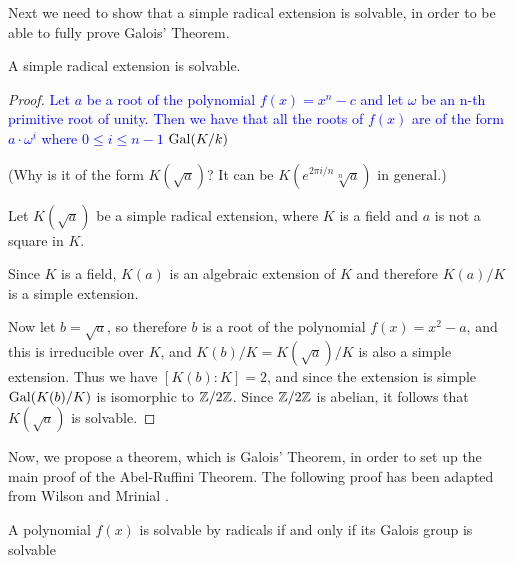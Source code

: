 Next we need to show that a simple radical extension is solvable, in order to be able to fully prove Galois' Theorem.

\begin{lemma}\label{lemma:solvable-radical-extension}
    A simple radical extension is solvable.
\end{lemma}

\begin{proof}

    \textcolor{blue}{Let $a$ be a root of the polynomial $f(x)=x^n-c$ and let $\omega$ be an n-th primitive root of unity. Then we have that all the roots of $f(x)$ are of the form $a \cdot \omega^i$ where $0\leq i \leq n-1$ $\operatorname{Gal}(K/k)$}
	    
	(\TODO Why is it of the form $K(\sqrt{a})$? It can be $K(e^{2\pi i / n}\sqrt[n]{a})$ in general.)
	
    Let $K(\sqrt{a})$ be a simple radical extension, where $K$ is a field and $a$ is not a square in $K$.

    Since $K$ is a field, $K(a)$ is an algebraic extension of $K$ and therefore $K(a)/K$ is a simple extension.
    
    \noindent
    Now let $b=\sqrt{a}$, so therefore $b$ is a root of the polynomial $f(x)=x^2-a$, and this is irreducible over $K$, and $K(b)/K = K(\sqrt{a})/K$ is also a simple extension. Thus we have $[K(b):K]=2$, and since the extension is simple $\operatorname{Gal}(K(b)/K)$ is isomorphic to $\mathbb Z/2\mathbb Z$. Since $\mathbb Z/2\mathbb Z$ is abelian, it follows that $K(\sqrt{a})$ is solvable.
\end{proof}

\noindent
Now, we propose a theorem, which is Galois' Theorem, in order to set up the main proof of the Abel-Ruffini Theorem. The following proof has been adapted from Wilson \cite{cambridge-galois-lecture-polynomials} and Mrinial \cite{Abel-Ruffini}.

\begin{theorem}\label{thm:galois-theorem}
     A polynomial $f(x)$ is solvable by radicals if and only if its Galois group is solvable
\end{theorem}

